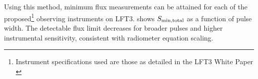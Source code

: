 



Using this method, minimum flux measurements can be attained for each of the proposed\footnote{Instrument specifications used are those as detailed in the LFT3 White Paper \cite{whitepaper}} observing instruments on LFT3.  shows $S_{\rm min, total}$ as a function of pulse width. The detectable flux limit decreases for broader pulses and higher instrumental sensitivity, consistent with radiometer equation scaling.

